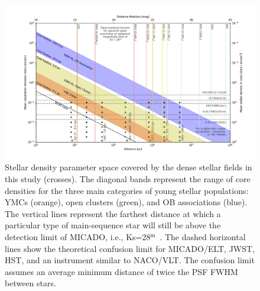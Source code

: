 \documentclass{aa}
\newcommand{\m}{$^\mathrm{m}$~}
\begin{document}
\begin{figure}

    \centering
    \includegraphics[width=\textwidth]{resolved_stellar_densities.pdf}

    \caption{Stellar density parameter space covered by the dense stellar fields in this study (crosses).
    The diagonal bands represent the range of core densities for the three main categories of young stellar populations: YMCs (orange), open clusters (green), and OB associations (blue).
    The vertical lines represent the farthest distance at which a particular type of main-sequence star will still be above the detection limit of MICADO, i.e., Ks=28\m.
    The dashed horizontal lines show the theoretical confusion limit for MICADO/ELT, JWST, HST, and an instrument similar to NACO/VLT.
    The confusion limit assumes an average minimum distance of twice the PSF FWHM between stars.
    }

    \label{fig:resolved_stellar_densities}

\end{figure}
\end{document}
